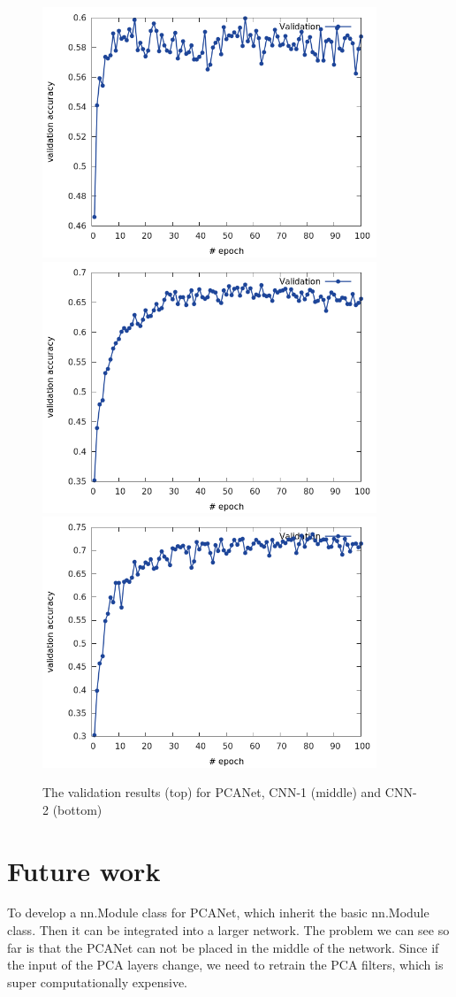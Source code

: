 \documentclass[10pt,twocolumn,letterpaper]{article}
\begin{document}
\begin{figure}
	\begin{center}
		\includegraphics[scale=1.7,width=10cm]{PCANet_val_list.png} 
		\includegraphics[scale=1.7,width=10cm]{CNN_val_list.png}
		\includegraphics[scale=1.7,width=10cm]{DCNN_val_list.png}
	\end{center}
	\caption{The validation results (top) for PCANet, CNN-1 (middle) and CNN-2 (bottom)}\label{Fig: validation result}
\end{figure}



\section{Future work}
To develop a nn.Module class for PCANet, which inherit the basic nn.Module class. Then it can be integrated into a larger network. The problem we can see so far is that the PCANet can not be placed in the middle of the network. Since if the input of the PCA layers change, we need to retrain the PCA filters, which is super computationally expensive.


{\small


}
\end{document}
